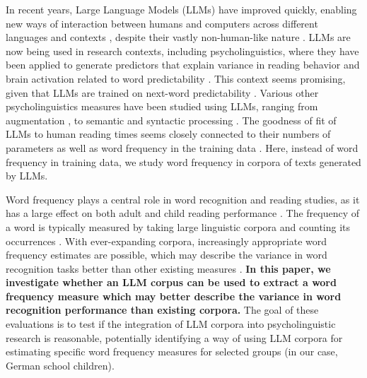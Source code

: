 \documentclass[manuscript]{stjour}
\begin{document}
In recent years, Large Language Models (LLMs) have improved quickly, enabling new ways of interaction between humans and computers \citep{bommasani_opportunities_2022} across different languages and contexts \citep{chang_when_2023, lai_chatgpt_2023}, despite their vastly non-human-like nature \citep{min_recent_2021, singhal_large_2023, evanson_language_2023, kasneci_chatgpt_2023}. LLMs are now being used in research contexts, including psycholinguistics, where they have been applied to generate predictors that explain variance in reading behavior and brain activation related to word predictability \citep{hofmann_language_2022, boeve_systematic_2024, botch_humans_2024, lopes_rego_language_2024, chandra_synthetic_2023, heilbron_lexical_2023}. This context seems promising, given that LLMs are trained on next-word predictability \citep{tay2022efficienttransformerssurvey}. Various other psycholinguistics measures have been studied using LLMs, ranging from augmentation \citep{trott_can_2024}, to semantic \citep{caucheteux_brains_2022} and syntactic processing \citep{fresen_language_2024,desbordes_dimensionality_2023}. The goodness of fit of LLMs to human reading times seems closely connected to their numbers of parameters \citep{oh_why_2023} as well as word frequency in the training data \citep{oh_frequency_2024,oh_dissociable_2025}. Here, instead of word frequency in training data, we study word frequency in corpora of texts generated by LLMs. 

Word frequency plays a central role in word recognition and reading studies, as it has a large effect on both adult and child reading performance \citep{brysbaert_impact_2016,brysbaert_word_2018,gregorova_access_2023,schroter_developmental_2017, kliegl_length_2004,hawelka_dual-route_2010}. The frequency of a word is typically measured by taking large linguistic corpora and counting its occurrences \citep[e.g., see ][]{brysbaert_word_2011,baayen_celex_1993,schroeder_childlex_2015,heister_dlexdb_2011}. With ever-expanding corpora, increasingly appropriate word frequency estimates are possible, which may describe the variance in word recognition tasks better than other existing measures \citep{brysbaert_word_2011}. \textbf{In this paper, we investigate whether an LLM corpus can be used to extract a word frequency measure which may better describe the variance in word recognition performance than existing corpora.} The goal of these evaluations is to test if the integration of LLM corpora into psycholinguistic research is reasonable, potentially identifying a way of using LLM corpora for estimating specific word frequency measures for selected groups (in our case, German school children).
\end{document}

